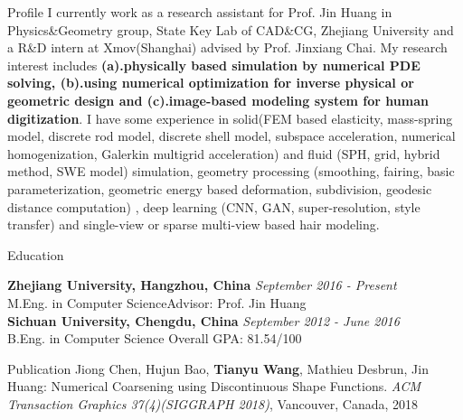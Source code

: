 \documentclass{resume} %
\begin{document}
\begin{rSection}{Profile}
I currently work as a research assistant for Prof. Jin Huang in Physics\&Geometry group, State Key Lab of CAD\&CG, Zhejiang University and a R\&D intern at Xmov(Shanghai) advised by Prof. Jinxiang Chai. My research interest includes \textbf{(a).physically based simulation by numerical PDE solving, (b).using numerical optimization for inverse physical or geometric design and (c).image-based modeling system for human digitization}. I have some experience in solid(FEM based elasticity, mass-spring model, discrete rod model, discrete shell model, subspace acceleration, numerical homogenization, Galerkin multigrid acceleration) and fluid (SPH, grid, hybrid method, SWE model) simulation, geometry processing (smoothing, fairing, basic parameterization, geometric energy based deformation, subdivision, geodesic distance computation) , deep learning (CNN, GAN, super-resolution, style transfer) and single-view or sparse multi-view based hair modeling.
\end{rSection}

\begin{rSection}{Education}

{\bf Zhejiang University, Hangzhou, China} \hfill {\em September 2016 - Present} 
\\ M.Eng. in Computer Science\hfill {Advisor: Prof. Jin Huang} 
\\{\bf Sichuan University, Chengdu, China} \hfill {\em September 2012 - June 2016} 
\\ B.Eng. in Computer Science\hfill { Overall GPA: 81.54/100 }

\end{rSection}

\begin{rSection}{Publication}
Jiong Chen, Hujun Bao, \textbf{Tianyu Wang}, Mathieu Desbrun, Jin Huang: Numerical Coarsening using Discontinuous Shape Functions. \emph{ACM Transaction Graphics 37(4)(SIGGRAPH 2018)}, Vancouver, Canada, 2018
\end{rSection}

\iffalse
\begin{rSection}{Work Experience}
\end{rSection}
\fi
\end{document}
